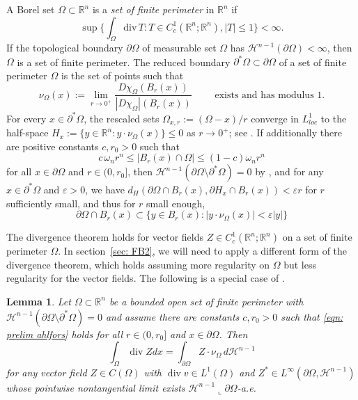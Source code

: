\documentclass[10pt, reqno]{amsart}
\numberwithin{equation}{section}
\newtheorem{lemma}[theorem]{Lemma}
\def\R{{\mathbb R}}
\def\e{\varepsilon}
\def\W{\Omega}
\def\om{\omega}
\begin{document}
A Borel set $\W\subset \R^n$ is a {\it set of finite perimeter} in $\R^n$ if 
\[\sup\Big\{ \int_\W \text{div}\,  T  : T\in C^1_c(\R^n; \R^n) , |T|\leq 1\Big\}<\infty.\]
If the topological boundary $\partial \W$ of measurable set $\W$ has  $\mathcal{H}^{n-1}(\partial \Omega) <\infty$, then $\W$ is a set of finite perimeter.
The reduced boundary $\partial^*\W \subset \partial \W$ of a set of finite perimeter $\W$ is the set of points such that 
\[
\nu_\W(x) := \lim_{r\to 0^+} \frac{D\chi_\W(B_r(x))}{|D\chi_\W| (B_r(x))} \qquad \text{ exists and has modulus }1.
\]
For every $x\in \partial^*\W$, the rescaled sets $\W_{x,r}:=(\W-x)/r$ converge in $L^1_{loc}$ to the half-space $H_x:= \{y \in \R^n : y \cdot \nu_\W(x)\} \leq 0$ as $r \to 0^+$; see \cite[Theorem 15.5]{MaggiBook}.
 If additionally there are positive constants $c, r_0>0$ such that
\[
  c\, \om_nr^n  \leq |B_r(x) \cap \W| \leq (1-c)\om_n r^n
\]
  for all $x \in \partial \W$ and $r\in (0,r_0]$, then $\mathcal{H}^{n-1}(\partial \W \setminus \partial^*\W) =0$ by \cite[Theorem 16.2]{MaggiBook}, and for any $x \in \partial^*\W$ and $\e>0$, we have $d_H(\partial \W \cap B_r(x) , \partial H_{x} \cap B_r(x)) < \e r$ for $r$ sufficiently small, and thus for $r$ small enough,
\begin{equation}\label{eqn: cone}
    \partial\W \cap B_r(x)\subset \{ y \in B_r(x): |y\cdot \nu_\W(x)| <\e|y|\} 
\end{equation}

The divergence theorem holds for vector fields $Z \in C^1_c(\R^n ; \R^n)$ on a set of finite perimeter $\W$. In section~\ref{sec: FB2}, we will need to apply a different form of the divergence theorem, which holds assuming more regularity on $\W$ but less regularity for the vector fields. The following is a special case of \cite[Theorem 2.3.1]{HMT}. 
\begin{lemma}\label{l:fancy div thm}
Let $\Omega \subset \mathbb{R}^{n}$ be a bounded open set of finite perimeter with $\mathcal{H}^{n-1}(\partial \W \setminus \partial^*\W)=0$ and assume there are constants $c, r_0>0 $ such that
\eqref{eqn: prelim ahlfors} holds
for all  $r \in (0,r_0]$ and $x \in \partial \W$.
Then
\[
\int_{\Omega} \operatorname{div} Z d x =\int_{\partial \Omega} Z \cdot \nu_\W \,  d\mathcal{H}^{n-1}
\]
for any vector field $Z \in C(\Omega)$ with $\operatorname{div} v \in L^1(\Omega)$ and $Z^* \in L^\infty( \partial \W, \mathcal{H}^{n-1})$ whose pointwise nontangential limit exists $\mathcal{H}^{n-1}\llcorner \partial \W$-a.e.
\end{lemma}
%
%
%
\end{document}
